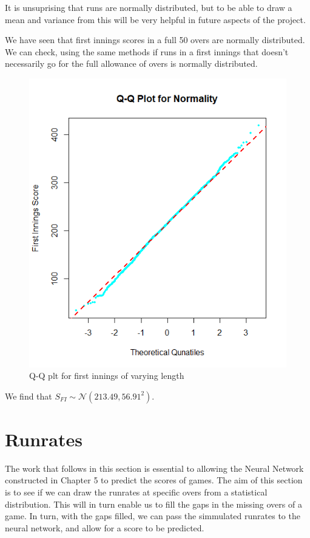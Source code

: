 It is unsuprising that runs are normally distributed, but to be able to draw a mean and variance from this will be very helpful in future aspects of the project.

We have seen that first innings scores in a full 50 overs are normally distributed. We can check, using the same methods if runs in a first innings that 
doesn't necessarily go for the full allowance of overs is normally distributed. 

\begin{figure}[h]
    \label{firstInnsQQ}
    \centering
    \includegraphics[scale=0.6]{figures/firstInnsQQ.png}
    \caption{Q-Q plt for first innings of varying length}
\end{figure}

We find that $S_{FI} \sim \mathcal{N}(213.49,56.91^2)$. 

\section{Runrates}
The work that follows in this section is essential to allowing the Neural Network constructed in Chapter 5 to predict the scores of games. The aim of this section is 
to see if we can draw the runrates at specific overs from a statistical distribution. This will in turn enable us to fill the gaps in the missing overs of a game. In turn, 
with the gaps filled, we can pass the simmulated runrates to the neural network, and allow for a score to be predicted. 

